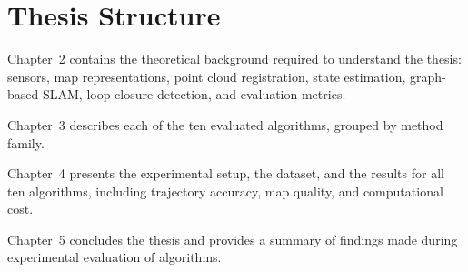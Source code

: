 

\section{Thesis Structure}

\begingroup
\setlength{\parskip}{2pt}
\setlength{\parindent}{1.5em}

%
%
%

Chapter~2 contains the theoretical background required to understand the
thesis: sensors, map representations, point cloud registration, state
estimation, graph-based SLAM, loop closure detection, and evaluation metrics.

Chapter~3 describes each of the ten evaluated algorithms, grouped by
method family.

Chapter~4 presents the experimental setup, the dataset, and the results for
all ten algorithms, including trajectory accuracy, map quality, and
computational cost.

Chapter~5 concludes the thesis and provides a summary of findings made during
experimental evaluation of algorithms.

\endgroup
